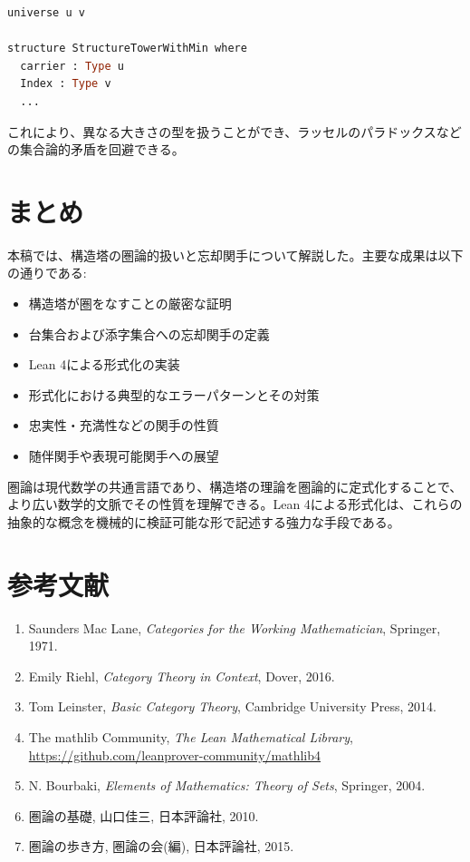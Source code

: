 \documentclass[a4paper,12pt]{article}
\theoremstyle{definition}
\begin{document}
\begin{lstlisting}[style=leanstyle, language=ML]
universe u v

structure StructureTowerWithMin where
  carrier : Type u
  Index : Type v
  ...
\end{lstlisting}

これにより、異なる大きさの型を扱うことができ、ラッセルのパラドックスなどの集合論的矛盾を回避できる。

\section{まとめ}

本稿では、構造塔の圏論的扱いと忘却関手について解説した。主要な成果は以下の通りである:

\begin{itemize}
\item 構造塔が圏をなすことの厳密な証明
\item 台集合および添字集合への忘却関手の定義
\item Lean 4による形式化の実装
\item 形式化における典型的なエラーパターンとその対策
\item 忠実性・充満性などの関手の性質
\item 随伴関手や表現可能関手への展望
\end{itemize}

圏論は現代数学の共通言語であり、構造塔の理論を圏論的に定式化することで、より広い数学的文脈でその性質を理解できる。Lean 4による形式化は、これらの抽象的な概念を機械的に検証可能な形で記述する強力な手段である。

\section*{参考文献}

\begin{enumerate}
\item Saunders Mac Lane, \textit{Categories for the Working Mathematician}, Springer, 1971.
\item Emily Riehl, \textit{Category Theory in Context}, Dover, 2016.
\item Tom Leinster, \textit{Basic Category Theory}, Cambridge University Press, 2014.
\item The mathlib Community, \textit{The Lean Mathematical Library}, \url{https://github.com/leanprover-community/mathlib4}
\item N. Bourbaki, \textit{Elements of Mathematics: Theory of Sets}, Springer, 2004.
\item 圏論の基礎, 山口佳三, 日本評論社, 2010.
\item 圏論の歩き方, 圏論の会(編), 日本評論社, 2015.
\end{enumerate}
\end{document}
